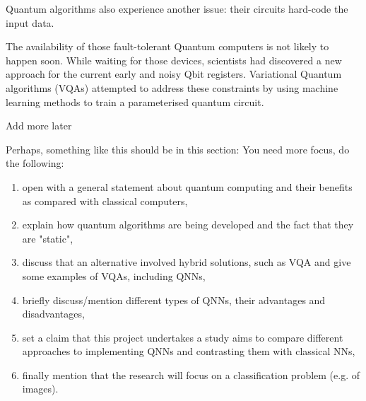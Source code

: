 Quantum algorithms also experience another issue: their circuits hard-code the input data. 

The availability of those fault-tolerant Quantum computers is not likely to happen soon. 
While waiting for those devices, scientists had discovered a new approach for the current early and noisy Qbit registers.
Variational Quantum algorithms (VQAs) \cite{cerezo2021variational} attempted to address these constraints by using machine learning methods to train a parameterised quantum circuit.
\begin{center}
    \vspace{10pt}
    Add more later
    \vspace{10pt} 
\end{center}
Perhaps, something like this should be in this section: You need more focus, do the following:
\begin{enumerate}
    \item open with a general statement about quantum computing and their benefits as compared with classical computers, 
    \item explain how quantum algorithms are being developed and the fact that they are "static",
    \item discuss that an alternative involved hybrid solutions, such as VQA and give some examples of VQAs, including QNNs, 
    \item briefly discuss/mention different types of QNNs, their advantages and disadvantages, 
    \item set a claim that this project undertakes a study aims to compare different approaches to implementing QNNs and contrasting them with classical NNs, 
    \item finally mention that the research will focus on a classification problem (e.g. of images).
\end{enumerate}

